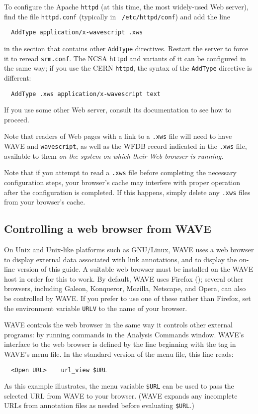 \documentclass[twoside]{book}
\newcommand{\WAVE}{{\sf WAVE}\xspace}
\begin{document}
To configure the Apache {\tt httpd} (at this time, the most widely-used
Web server), find the file {\tt httpd.conf} (typically in {\tt
/etc/httpd/conf}) and add the line
\begin{verbatim}
  AddType application/x-wavescript .xws
\end{verbatim}
\noindent
in the section that contains other {\tt AddType} directives.  Restart
the server to force it to reread {\tt srm.conf}.  The NCSA {\tt httpd}
and variants of it can be configured in the same way;  if you use the
CERN {\tt httpd}, the syntax of the {\tt AddType} directive is different:
\begin{verbatim}
  AddType .xws application/x-wavescript text
\end{verbatim}
\noindent
If you use some other Web server, consult its documentation to see how
to proceed.

Note that readers of Web pages with a link to a {\tt .xws} file will
need to have \WAVE{} and {\tt wavescript}, as well as the WFDB record
indicated in the {\tt .xws} file, available to them \emph{on the
system on which their Web browser is running}.

Note that if you attempt to read a {\tt .xws} file before completing
the necessary configuration steps, your browser's cache may interfere
with proper operation after the configuration is completed.  If this
happens, simply delete any {\tt .xws} files from your browser's cache.

\subsection*{Controlling a web browser from \WAVE{}}

On Unix and Unix-like platforms such as GNU/Linux, \WAVE{} uses a web
browser to display external data associated with link annotations, and
to display the on-line version of this guide.  A suitable web browser
must be installed on the \WAVE{} host in order for this to work.  By
default, \WAVE{} uses Firefox ();
several other browsers, including Galeon, Konqueror, Mozilla,
Netscape, and Opera, can also be controlled by \WAVE{}.  If you prefer
to use one of these rather than Firefox, set the environment variable
{\tt URLV} to the name of your browser.

\WAVE{} controls the web browser in the same way it controls other
external programs:  by running commands in the {\sf Analysis Commands}
window.  \WAVE{}'s interface to the web browser is defined by the
line beginning with the {\tt <Open URL>} tag in \WAVE{}'s menu
file.  In the standard version of the menu file, this line reads:
\begin{verbatim}
  <Open URL>    url_view $URL
\end{verbatim}
\noindent
As this example illustrates, the menu variable {\tt \$URL} can be used
to pass the selected URL from \WAVE{} to your browser.  (\WAVE{}
expands any incomplete URLs from annotation files as needed before
evaluating {\tt \$URL}.)
\end{document}
